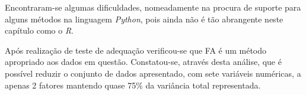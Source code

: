 \documentclass[12pt, a4paper]{article}
\begin{document}
Encontraram-se algumas
dificuldades, nomeadamente na procura de suporte para alguns métodos na
linguagem \emph{Python}, pois ainda não é tão abrangente neste capítulo
como o \emph{R}.

Após realização de teste de
adequação verificou-se que FA é um método apropriado aos dados em
questão. Constatou-se, através desta análise, que é possível reduzir o
conjunto de dados apresentado, com sete variáveis numéricas, a apenas 2
fatores mantendo quase 75\% da variância total representada.

\printbibliography
\end{document}
